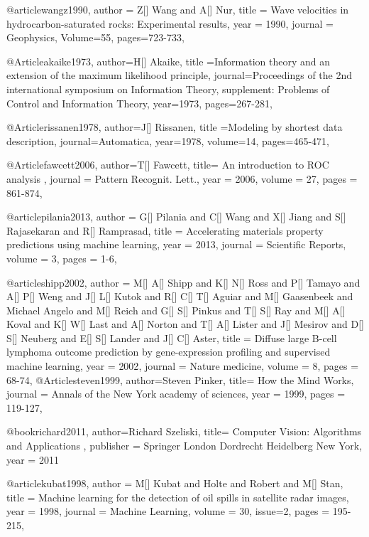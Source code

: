 @article{wangz1990,
  author =	 {Z[] Wang and A[] Nur},
  title =	 {Wave velocities in hydrocarbon-saturated rocks: Experimental results},
  year =	 1990,
  journal =	 {Geophysics},
    Volume=55,
 pages=723-733,
}


@Article{akaike1973,
  author={H[] Akaike},
  title ={Information theory and an extension of the maximum likelihood principle},
  journal={Proceedings of the 2nd international symposium on Information Theory, supplement: Problems of Control and Information Theory},
  year=1973,
  pages={267-281},
}

@Article{rissanen1978,
  author={J[] Rissanen},
  title ={Modeling by shortest data description},
  journal={Automatica},
  year=1978,
  volume=14,
  pages={465-471},
}

@Article{fawcett2006,
  author={T[] Fawcett},
  title={ An introduction to ROC analysis },
  journal = 	 {Pattern Recognit. Lett.},
  year = 	 2006,
  volume =	 27,
  pages =	 {861-874},
}

@article{pilania2013,
author = {G[] Pilania and C[] Wang and X[] Jiang and S[] Rajasekaran and R[] Ramprasad},
title = {Accelerating materials property predictions using machine learning},
year = {2013},
journal = {Scientific Reports},
volume = {3},
pages = {1-6},
}

@article{shipp2002,
author = {M[] A[] Shipp and K[] N[] Ross and P[] Tamayo and A[] P[] Weng and J[] L[] Kutok and R[] C[] T[] Aguiar and M[] Gaasenbeek and Michael Angelo and M[] Reich and G[] S[] Pinkus and T[] S[] Ray and M[] A[] Koval and K[] W[] Last and A[] Norton and T[] A[] Lister and J[] Mesirov and D[] S[] Neuberg and E[] S[] Lander and J[] C[] Aster},
title = {Diffuse large B-cell lymphoma outcome prediction by gene-expression profiling and supervised machine learning},
year = {2002},
journal = {Nature medicine},
volume = {8},
pages = {68-74},
}
@Article{steven1999,
  author={Steven Pinker},
  title={ How the Mind Works},
  journal = 	 {Annals of the New York academy of sciences},
  year = 	 1999,
  pages =	 {119-127},
}

@book{richard2011,
  author={Richard Szeliski},
  title={ Computer Vision: Algorithms and Applications },
  publisher = 	 {Springer London Dordrecht Heidelberg New York},
  year = 	 2011
}

@article{kubat1998,
author = {M[] Kubat and Holte and Robert and M[] Stan},
title = {Machine learning for the detection of oil spills in satellite radar images},
year = {1998},
journal = {Machine Learning},
volume = {30},
issue=2,
pages = {195-215},
}

